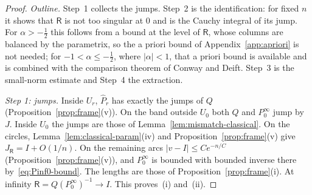 \begin{proof}
\emph{Outline.} Step~1 collects the jumps. Step~2 is the identification: for fixed $n$ it shows that $\mathsf R$ is not
too singular at $0$ and is the Cauchy integral of its jump. For $\alpha>-\frac12$ this follows from a bound at the level
of $\mathsf R$, whose columns are balanced by the parametrix, so the a priori bound of Appendix~\ref{app:apriori} is not
needed; for $-1<\alpha\le-\frac12$, where $|\alpha|<1$, that a priori bound is available and is combined with the
comparison theorem of Conway and Deift. Step~3 is the small-norm estimate and Step~4 the extraction.

\emph{Step 1: jumps.} Inside $U_r$, $\hat P_r$ has exactly the jumps of $Q$ (Proposition~\ref{prop:frame}(v)). On the band
outside $U_0$ both $Q$ and $P^\infty_0$ jump by $J$. Inside $U_0$ the jumps are those of Lemma~\ref{lem:mismatch-classical}.
On the circles, Lemma~\ref{lem:classical-param}(iv) and Proposition~\ref{prop:frame}(v) give $J_{\mathsf R}=I+O(1/n)$. On the
remaining arcs $|v-I|\le Ce^{-n/C}$ (Proposition~\ref{prop:frame}(v)), and $P^\infty_0$ is bounded with bounded inverse there
by~\eqref{eq:Pinf0-bound}. The lengths are those of Proposition~\ref{prop:frame}(i). At infinity $\mathsf R=Q(P^\infty_0)^{-1}\to I$.
This proves~(i) and~(ii).


\end{proof}
